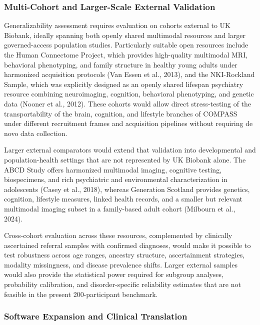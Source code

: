 \documentclass[11pt,a4paper,twoside]{article}
\begin{document}
\subsubsection{Multi-Cohort and Larger-Scale External Validation}

Generalizability assessment requires evaluation on cohorts external to UK Biobank, ideally spanning both openly shared multimodal resources and larger governed-access population studies. Particularly suitable open resources include the Human Connectome Project, which provides high-quality multimodal MRI, behavioral phenotyping, and family structure in healthy young adults under harmonized acquisition protocols (Van Essen et al., 2013), and the NKI-Rockland Sample, which was explicitly designed as an openly shared lifespan psychiatry resource combining neuroimaging, cognition, behavioral phenotyping, and genetic data (Nooner et al., 2012). These cohorts would allow direct stress-testing of the transportability of the brain, cognition, and lifestyle branches of COMPASS under different recruitment frames and acquisition pipelines without requiring de novo data collection.

Larger external comparators would extend that validation into developmental and population-health settings that are not represented by UK Biobank alone. The ABCD Study offers harmonized multimodal imaging, cognitive testing, biospecimens, and rich psychiatric and environmental characterization in adolescents (Casey et al., 2018), whereas Generation Scotland provides genetics, cognition, lifestyle measures, linked health records, and a smaller but relevant multimodal imaging subset in a family-based adult cohort (Milbourn et al., 2024).

Cross-cohort evaluation across these resources, complemented by clinically ascertained referral samples with confirmed diagnoses, would make it possible to test robustness across age ranges, ancestry structure, ascertainment strategies, modality missingness, and disease prevalence shifts. Larger external samples would also provide the statistical power required for subgroup analyses, probability calibration, and disorder-specific reliability estimates that are not feasible in the present 200-participant benchmark.

\subsubsection{Software Expansion and Clinical Translation}
\end{document}
